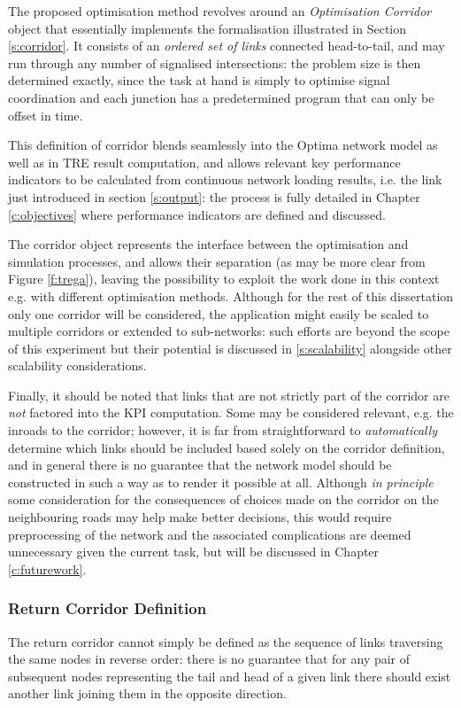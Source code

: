 The proposed optimisation method revolves around an \emph{Optimisation Corridor} object that essentially implements the formalisation illustrated in Section \ref{s:corridor}. It consists of an \emph{ordered set of links} connected head-to-tail, and may run through any number of signalised intersections: the problem size is then determined exactly, since the task at hand is simply to optimise signal coordination and each junction has a predetermined program that can only be offset in time.

This definition of corridor blends seamlessly into the Optima network model as well as in TRE result computation, and allows relevant key performance indicators to be calculated from continuous network loading results, i.e. the link  just introduced in section \ref{s:output}: the process is fully detailed in Chapter \ref{c:objectives} where performance indicators are defined and discussed.

The corridor object represents the interface between the optimisation and simulation processes, and allows their separation (as may be more clear from Figure \ref{f:trega}), leaving the possibility to exploit the work done in this context e.g. with different optimisation methods. Although for the rest of this dissertation only one corridor will be considered, the application might easily be scaled to multiple corridors or extended to sub-networks: such efforts are beyond the scope of this experiment but their potential is discussed in \ref{s:scalability} alongside other scalability considerations.

Finally, it should be noted that links that are not strictly part of the corridor are \emph{not} factored into the KPI computation. Some may be considered relevant, e.g. the inroads to the corridor; however, it is far from straightforward to \emph{automatically} determine which links should be included based solely on the corridor definition, and in general there is no guarantee that the network model should be constructed in such a way as to render it possible at all. Although \emph{in principle} some consideration for the consequences of choices made on the corridor on the neighbouring roads may help make better decisions, this would require preprocessing of the network and the associated complications are deemed unnecessary given the current task, but will be discussed in Chapter \ref{c:futurework}.

\subsubsection*{Return Corridor Definition}
The return corridor cannot simply be defined as the sequence of links traversing the same nodes in reverse order: there is no guarantee that for any pair of subsequent nodes representing the tail and head of a given link there should exist another link joining them in the opposite direction.

